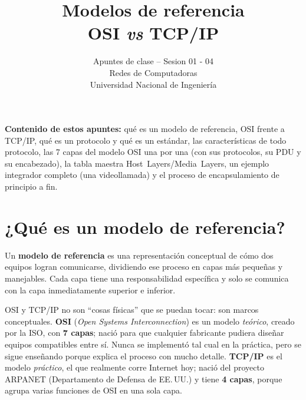 \documentclass[11pt,a4paper]{article}
\title{\vspace{-2cm}\Huge\bfseries\color{uniDark} Modelos de referencia\\[2pt] OSI \textit{vs} TCP/IP}
\author{Apuntes de clase -- Sesion 01 - 04\\ Redes de Computadoras\\ Universidad Nacional de Ingeniería}
\date{}
\begin{document}
\maketitle
\thispagestyle{empty}

\begin{center}
\end{center}

\vspace{0.3cm}
\noindent\textbf{Contenido de estos apuntes:} qué es un modelo de referencia, OSI frente a TCP/IP, qué es un protocolo y qué es un estándar, las características de todo protocolo, las 7 capas del modelo OSI una por una (con sus protocolos, su PDU y su encabezado), la tabla maestra Host~Layers/Media~Layers, un ejemplo integrador completo (una videollamada) y el proceso de encapsulamiento de principio a fin.

\newpage
\tableofcontents
\newpage

\section{¿Qué es un modelo de referencia?}

\begin{defbox}
Un \textbf{modelo de referencia} es una representación conceptual de cómo dos equipos logran comunicarse, dividiendo ese proceso en capas más pequeñas y manejables. Cada capa tiene una responsabilidad específica y solo se comunica con la capa inmediatamente superior e inferior.
\end{defbox}

OSI y TCP/IP no son ``cosas físicas'' que se puedan tocar: son marcos conceptuales. \textbf{OSI} (\textit{Open Systems Interconnection}) es un modelo \textit{teórico}, creado por la ISO, con \textbf{7 capas}; nació para que cualquier fabricante pudiera diseñar equipos compatibles entre sí. Nunca se implementó tal cual en la práctica, pero se sigue enseñando porque explica el proceso con mucho detalle. \textbf{TCP/IP} es el modelo \textit{práctico}, el que realmente corre Internet hoy; nació del proyecto ARPANET (Departamento de Defensa de EE.\,UU.) y tiene \textbf{4 capas}, porque agrupa varias funciones de OSI en una sola capa.
\end{document}
